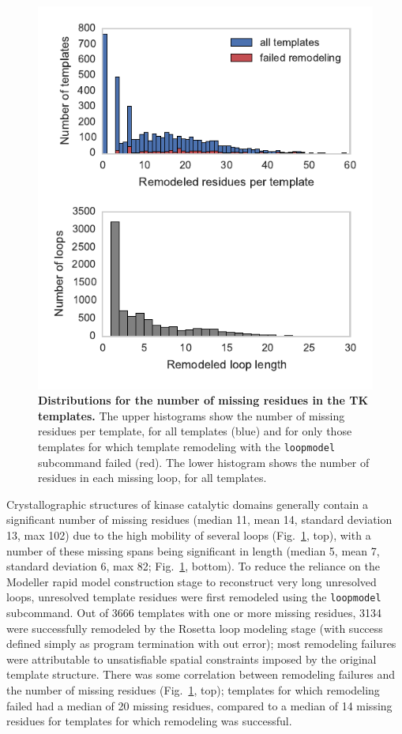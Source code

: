 \documentclass[aps,pre,twocolumn,nofootinbib,superscriptaddress,linenumbers]{revtex4-1}
\begin{document}
\begin{figure}[tbp]
    \includegraphics[width=\textwidth]{loopmodel_analysis/nmissing_resis_distributions.pdf}
    \caption{{\bf Distributions for the number of missing residues in the TK templates.}
    The upper histograms show the number of missing residues per template, for all templates (blue) and for only those templates for which template remodeling with the {\tt loopmodel} subcommand failed (red).
    The lower histogram shows the number of residues in each missing loop, for all templates.
}
    \label{figure:loopmodel-nmissing-residues}
\end{figure}

Crystallographic structures of kinase catalytic domains generally contain a significant number of missing residues (median 11, mean 14, standard deviation 13, max 102) due to the high mobility of several loops (Fig.~\ref{figure:loopmodel-nmissing-residues}, top), with a number of these missing spans being significant in length (median 5, mean 7, standard deviation 6, max 82; Fig.~\ref{figure:loopmodel-nmissing-residues}, bottom).
To reduce the reliance on the Modeller rapid model construction stage to reconstruct very long unresolved loops, unresolved template residues were first remodeled using the {\tt loopmodel} subcommand.
Out of \num{3666} templates with one or more missing residues, \num{3134} were successfully remodeled by the Rosetta loop modeling stage (with success defined simply as program termination with out error); most remodeling failures were attributable to unsatisfiable spatial constraints imposed by the original template structure.
There was some correlation between remodeling failures and the number of missing residues (Fig.~\ref{figure:loopmodel-nmissing-residues}, top); templates for which remodeling failed had a median of 20 missing residues, compared to a median of 14 missing residues for templates for which remodeling was successful.
\end{document}
